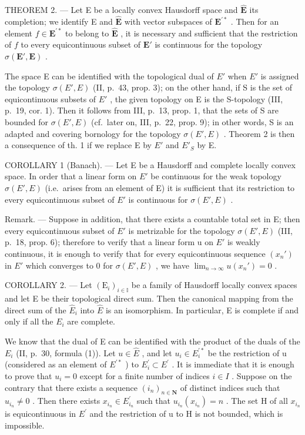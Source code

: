 THEOREM 2. --- Let E be a locally convex Hausdorff space and \(\hat{\mathbf{E}}\) its completion; we identify E and \(\hat{\mathbf{E}}\) with vector subspaces of \(\mathbf{E}^{\prime *}\) . Then for an element \(f \in \mathbf{E}^{\prime *}\) to belong to \(\hat{\mathbf{E}}\) , it is necessary and sufficient that the restriction of \(f\) to every equicontinuous subset of \(\mathbf{E}'\) is continuous for the topology \(\sigma(\mathbf{E}', \mathbf{E})\) .

The space E can be identified with the topological dual of \(E'\) when \(E'\) is assigned the topology \(\sigma(E', E)\) (II, p.~43, prop. 3); on the other hand, if S is the set of equicontinuous subsets of \(E'\) , the given topology on E is the S-topology (III, p.~19, cor. 1). Then it follows from III, p.~13, prop. 1, that the sets of S are bounded for \(\sigma(E', E)\) (cf.~later on, III, p.~22, prop. 9); in other words, S is an adapted and covering bornology for the topology \(\sigma(E', E)\) . Theorem 2 is then a consequence of th. 1 if we replace E by \(E'\) and \(E'_{S}\) by E.

COROLLARY 1 (Banach). --- Let E be a Hausdorff and complete locally convex space. In order that a linear form on \(E'\) be continuous for the weak topology \(\sigma(E', E)\) (i.e.~arises from an element of E) it is sufficient that its restriction to every equicontinuous subset of \(E'\) is continuous for \(\sigma(E', E)\) .

Remark. --- Suppose in addition, that there exists a countable total set in E; then every equicontinuous subset of \(E'\) is metrizable for the topology \(\sigma(E', E)\) (III, p.~18, prop. 6); therefore to verify that a linear form u on \(E'\) is weakly continuous, it is enough to verify that for every equicontinuous sequence \((x_{n}')\) in \(E'\) which converges to 0 for \(\sigma(E', E)\) , we have \(\lim_{n \to \infty} u(x_{n}') = 0\) .

COROLLARY 2. --- Let \((\mathrm{E}_{i})_{i\in\mathbb{I}}\) be a family of Hausdorff locally convex spaces and let E be their topological direct sum. Then the canonical mapping from the direct sum of the \(\hat{E}_{i}\) into \(\hat{E}\) is an isomorphism. In particular, E is complete if and only if all the \(E_{i}\) are complete.

We know that the dual of E can be identified with the product of the duals of the \(E_{i}\) (II, p.~30, formula (1)). Let \(u \in \hat{E}\) , and let \(u_{i} \in E_{i}^{\prime *}\) be the restriction of u (considered as an element of \(E^{\prime *}\) ) to \(E_{i}^{\prime} \subset E^{\prime}\) . It is immediate that it is enough to prove that \(u_{i} = 0\) except for a finite number of indices \(i \in I\) . Suppose on the contrary that there exists a sequence \((i_{n})_{n \in \mathbf{N}}\) of distinct indices such that \(u_{i_{n}} \neq 0\) . Then there exists \(x_{i_{n}} \in E_{i_{n}}^{\prime}\) such that \(u_{i_{n}}(x_{i_{n}}) = n\) . The set H of all \(x_{i_{n}}\) is equicontinuous in \(E^{\prime}\) and the restriction of u to H is not bounded, which is impossible.

